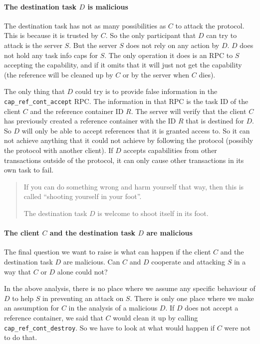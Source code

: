 \documentclass[9pt,a4paper]{extarticle}
\newenvironment{comment}{\footnotesize \begin{quote}}{\end{quote}}
\begin{document}
\paragraph{The destination task $D$ is malicious}

The destination task has not as many possibilities as $C$ to attack
the protocol.  This is because it is trusted by $C$.  So the only
participant that $D$ can try to attack is the server $S$.  But the
server $S$ does not rely on any action by $D$.  $D$ does not hold any
task info caps for $S$.  The only operation it does is an RPC to $S$
accepting the capability, and if it omits that it will just not get
the capability (the reference will be cleaned up by $C$ or by the
server when $C$ dies).

The only thing that $D$ could try is to provide false information in
the \verb/cap_ref_cont_accept/ RPC.  The information in that RPC is
the task ID of the client $C$ and the reference container ID $R$.  The
server will verify that the client $C$ has previously created a
reference container with the ID $R$ that is destined for $D$.  So $D$
will only be able to accept references that it is granted access to.
So it can not achieve anything that it could not achieve by following
the protocol (possibly the protocol with another client).  If $D$
accepts capabilities from other transactions outside of the protocol,
it can only cause other transactions in its own task to fail.

\begin{comment}
  If you can do something wrong and harm yourself that way, then this
  is called ``shooting yourself in your foot''.
  
  The destination task $D$ is welcome to shoot itself in its foot.
\end{comment}

\paragraph{The client $C$ and the destination task $D$ are malicious}

The final question we want to raise is what can happen if the client
$C$ and the destination task $D$ are malicious.  Can $C$ and $D$
cooperate and attacking $S$ in a way that $C$ or $D$ alone could not?

In the above analysis, there is no place where we assume any specific
behaviour of $D$ to help $S$ in preventing an attack on $S$.  There is
only one place where we make an assumption for $C$ in the analysis of
a malicious $D$.  If $D$ does not accept a reference container, we
said that $C$ would clean it up by calling
\verb/cap_ref_cont_destroy/.  So we have to look at what would happen
if $C$ were not to do that.
\end{document}
